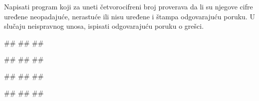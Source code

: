 \begin{Exercise}[label=KT_NG_16] 
Napisati program koji za uneti četvorocifreni broj proverava
da li su njegove cifre uređene neopadajuće, nerastuće ili nisu
uređene i štampa odgovarajuću poruku.  
U slučaju neispravnog unosa, ispisati odgovarajuću poruku o grešci.

\begin{miditest}
\begin{upotreba}{1}
#\naslovInt#
##
##
\end{upotreba}
\end{miditest}
\begin{miditest}
\begin{upotreba}{2}
#\naslovInt#
##
##\end{upotreba}
\end{miditest}

\begin{miditest}
\begin{upotreba}{3}
#\naslovInt#
##
##
\end{upotreba}
\end{miditest}
\begin{miditest}
\begin{upotreba}{4}
#\naslovInt#
##
##
\end{upotreba}
\end{miditest}

\end{Exercise}
\ifresenja
 \begin{Answer}[ref=KT_NG_16]
\end{Answer}
\fi


